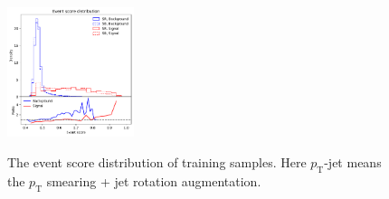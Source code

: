 \documentclass[12pt]{article}
\begin{document}
\begin{figure}[htpb]
{				\includegraphics[width=0.33\textwidth]{HVmodel_event_score_pt_jet_aug_3_train_SR_SB_SB_7_res_25.pdf}
			} 
			\caption{The event score distribution of training samples. Here $p_{\text{T}}$-jet means the $p_{\text{T}}$ smearing + jet rotation augmentation.}
			\label{fig:event_score_train_SR_SB_res_25}
		\end{figure}
	



		
\end{document}
